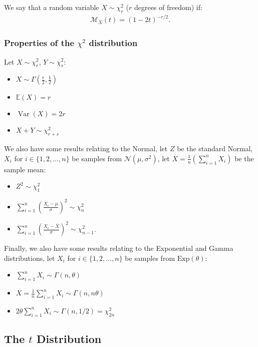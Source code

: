 \documentclass[a4paper, 12pt, twoside]{article}
\DeclareMathOperator{\Var}{Var}
\begin{document}
We say that a random variable $X \sim \chi^2_r$ ($r$ degrees of freedom)
if:
\begin{align*}
    \mathcal{M}_X(t) = (1 - 2t)^{-r / 2}.
\end{align*}

\subsubsection{Properties of the $\chi^2$ distribution}

Let $X \sim \chi^2_r$, $Y \sim \chi^2_s$:

\begin{itemize}
    \item $X \sim \Gamma(\frac{r}{2}, \frac{1}{2})$
    \item $\mathbb{E}(X) = r$
    \item $\Var(X) = 2r$
    \item $X + Y \sim \chi^2_{r + s}$
\end{itemize}

We also have some results relating to the Normal, let $Z$ be the standard
Normal, $X_i$ for $i \in \{1, 2, \ldots, n\}$ be samples from 
$\mathcal{N}(\mu, \sigma^2)$, let $\overline{X} = \frac{1}{n}
(\sum_{i = 1}^n X_i)$ be the sample mean:

\begin{itemize}
    \item $Z^2 \sim \chi^2_1$   
    \item $\sum_{i = 1}^n (\frac{X_i - \mu}{\sigma})^2 \sim \chi^2_n$
    \item $\sum_{i = 1}^n (\frac{X_i - \overline{X}}{\sigma})^2 \sim \chi^2_{n-1}$.
\end{itemize}

Finally, we also have some results relating to the Exponential and Gamma
distributions, let $X_i$ for $i \in \{1, 2, \ldots, n\}$ be samples
from $\text{Exp}(\theta)$:

\begin{itemize}
    \item $\sum_{i = 1}^n X_i \sim \Gamma(n, \theta)$
    \item $\overline{X} = \frac{1}{n} \sum_{i = 1}^n X_i \sim \Gamma(n, n\theta)$
    \item $2\theta \sum_{i = 1}^n X_i \sim \Gamma(n, 1/2) = \chi^2_{2n}$
\end{itemize}

\subsection{The $t$ Distribution}
\end{document}
